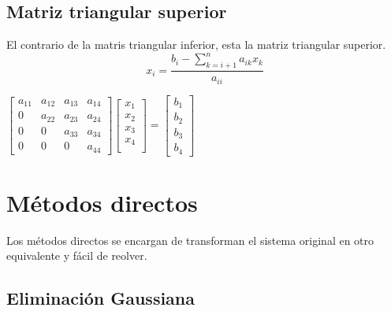 \subsection{Matriz triangular superior}
El contrario de la matris triangular inferior, esta la matriz triangular superior.
\begin{displaymath}
\nonumber x_i=\frac{b_i-\sum_{k=i+1}^{n}a_{ik}x_k}{a_{ii}} 
\end{displaymath}
\begin{center}
$\begin{bmatrix} a_{11} & a_{12} & a_{13} & a_{14} \\
				 0 & a_{22} & a_{23} & a_{24} \\
				 0 & 0 & a_{33} & a_{34} \\
				 0 & 0 & 0 & a_{44}
\end{bmatrix}\begin{bmatrix} x_1 \\
							 x_2 \\
							 x_3 \\
							 x_4 \\
\end{bmatrix} = \begin{bmatrix} b_1 \\
							   b_2 \\
							   b_3 \\
							   b_4 
\end{bmatrix}$
\end{center}
\section{M\'etodos directos}
Los m\'etodos directos se encargan de transforman el sistema original en otro equivalente y f\'acil de reolver.
\subsection{Eliminaci\'on Gaussiana}
